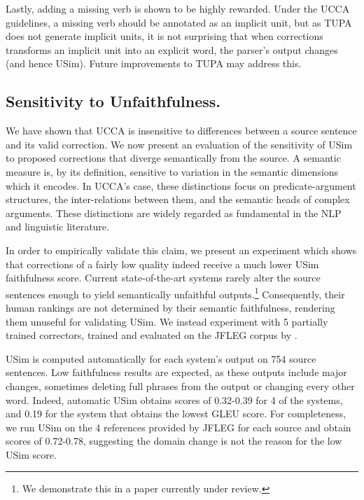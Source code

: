 \documentclass[a4paper, 11pt]{article}
\begin{document}
Lastly, adding a missing verb is shown to be highly rewarded. Under the UCCA guidelines, a missing verb should be annotated as an implicit unit, but as TUPA does not generate implicit units, it is not surprising that when corrections transforms an implicit unit into an explicit word, the parser's output changes (and hence {\sc USim}). Future improvements to TUPA may address this.

\subsection{Sensitivity to Unfaithfulness.}\label{subsec:sensitivity}

We have shown that UCCA is insensitive to differences between a source sentence
and its valid correction. We now present an evaluation of the sensitivity of {\sc USim}
to proposed corrections that diverge semantically from the source.
A semantic measure is, by its definition, sensitive to variation in
the semantic dimensions which it encodes. 
In UCCA's case, these distinctions focus on predicate-argument structures,
the inter-relations between them, and the semantic heads of complex arguments.
These distinctions are widely regarded as fundamental in the NLP and linguistic literature.

In order to empirically validate this claim, we present an experiment which shows that corrections
of a fairly low quality indeed receive a much lower {\sc USim} faithfulness score.
Current state-of-the-art systems rarely alter the source sentences enough to yield semantically unfaithful outputs.\footnote{We demonstrate this in a paper currently under review.}
Consequently, their human rankings are not determined by their semantic faithfulness, rendering them unuseful for validating {\sc USim}.
We instead experiment with 5 partially trained correctors, trained and evaluated on the
JFLEG corpus \cite{napoles2017jfleg} by .

{\sc USim} is computed automatically for each system's output on 754 source sentences.
Low faithfulness results are expected, as these outputs include major changes,
sometimes deleting full phrases from the output or changing every other word.
Indeed, automatic {\sc USim} obtains scores of 0.32-0.39 for 4 of the systems, and 0.19
for the system that obtains the lowest GLEU \cite{napoles2015ground} score.
For completeness, we run {\sc USim} on the 4 references provided by JFLEG for each
source and obtain scores of 0.72-0.78, suggesting the domain change is not the reason for the low {\sc USim} score.
\end{document}
